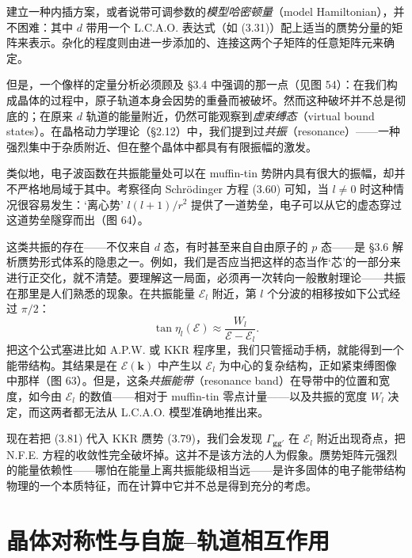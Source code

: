 
建立一种内插方案，或者说带可调参数的\emph{模型哈密顿量}（model Hamiltonian），并不困难：其中 $d$ 带用一个 L.C.A.O. 表达式（如 (3.31)）配上适当的赝势分量的矩阵来表示。杂化的程度则由进一步添加的、连接这两个子矩阵的任意矩阵元来确定。

但是，一个像样的定量分析必须顾及 §3.4 中强调的那一点（见图 54）：在我们构成晶体的过程中，原子轨道本身会因势的重叠而被破坏。然而这种破坏并不总是彻底的；在原来 $d$ 轨道的能量附近，仍然可能观察到\emph{虚束缚态}（virtual bound states）。在晶格动力学理论（§2.12）中，我们提到过\emph{共振}（resonance）——一种强烈集中于杂质附近、但在整个晶体中都具有有限振幅的激发。

类似地，电子波函数在共振能量处可以在 muffin-tin 势阱内具有很大的振幅，却并不严格地局域于其中。考察径向 Schrödinger 方程 (3.60) 可知，当 $l\neq0$ 时这种情况很容易发生：‘离心势’ $l(l+1)/r^2$ 提供了一道势垒，电子可以从它的虚态穿过这道势垒隧穿而出（图 64）。


这类共振的存在——不仅来自 $d$ 态，有时甚至来自自由原子的 $p$ 态——是 §3.6 解析赝势形式体系的隐患之一。例如，我们是否应当把这样的态当作‘芯’的一部分来进行正交化，就不清楚。要理解这一局面，必须再一次转向一般散射理论——共振在那里是人们熟悉的现象。在共振能量 $\mathcal{E}_l$ 附近，第 $l$ 个分波的相移按如下公式经过 $\pi/2$：
\begin{equation*}
\tan\eta_l(\mathcal{E})\approx\frac{W_l}{\mathcal{E}-\mathcal{E}_l}.\tag{3.81}
\end{equation*}
把这个公式塞进比如 A.P.W. 或 KKR 程序里，我们只管摇动手柄，就能得到一个能带结构。其结果是在 $\mathcal{E}(\mathbf{k})$ 中产生以 $\mathcal{E}_l$ 为中心的复杂结构，正如紧束缚图像中那样（图 63）。但是，这条\emph{共振能带}（resonance band）在导带中的位置和宽度，如今由 $\mathcal{E}_l$ 的数值——相对于 muffin-tin 零点计量——以及共振的宽度 $W_l$ 决定，而这两者都无法从 L.C.A.O. 模型准确地推出来。

现在若把 (3.81) 代入 KKR 赝势 (3.79)，我们会发现 $\Gamma_{\mathbf{gg}'}$ 在 $\mathcal{E}_l$ 附近出现奇点，把 N.F.E. 方程的收敛性完全破坏掉。这并不是该方法的人为假象。赝势矩阵元强烈的能量依赖性——哪怕在能量上离共振能级相当远——是许多固体的电子能带结构物理的一个本质特征，而在计算中它并不总是得到充分的考虑。

\section{晶体对称性与自旋–轨道相互作用}


